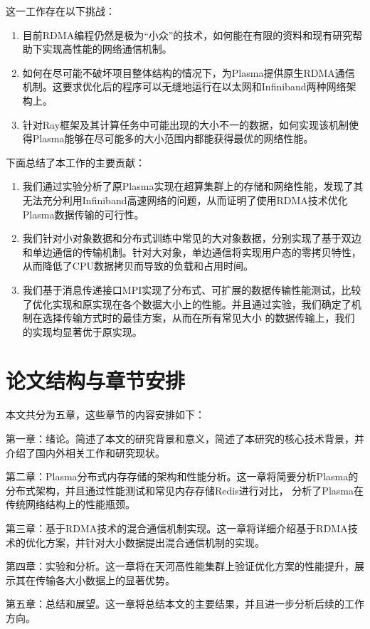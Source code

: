 这一工作存在以下挑战：

\begin{enumerate}
	\item 目前RDMA编程仍然是极为“小众”的技术，如何能在有限的资料和现有研究帮助下实现高性能的网络通信机制。
	\item 如何在尽可能不破坏项目整体结构的情况下，为Plasma提供原生RDMA通信机制。这要求优化后的程序可以无缝地运行在以太网和Infiniband两种网络架构上。
	\item 针对Ray框架及其计算任务中可能出现的大小不一的数据，如何实现该机制使得Plasma能够在尽可能多的大小范围内都能获得最优的网络性能。
\end{enumerate}

下面总结了本工作的主要贡献：

\begin{enumerate}
	\item 我们通过实验分析了原Plasma实现在超算集群上的存储和网络性能，发现了其无法充分利用Infiniband高速网络的问题，从而证明了使用RDMA技术优化Plasma数据传输的可行性。
	\item 我们针对小对象数据和分布式训练中常见的大对象数据，分别实现了基于双边和单边通信的传输机制。针对大对象，单边通信将实现用户态的零拷贝特性，从而降低了CPU数据拷贝而导致的负载和占用时间。
	\item 我们基于消息传递接口MPI实现了分布式、可扩展的数据传输性能测试，比较了优化实现和原实现在各个数据大小上的性能。并且通过实验，我们确定了机制在选择传输方式时的最佳方案，从而在所有常见大小
	的数据传输上，我们的实现均显著优于原实现。
\end{enumerate}

\section{论文结构与章节安排}
\label{sec:arrangement}

本文共分为五章，这些章节的内容安排如下：

第一章：绪论。简述了本文的研究背景和意义，简述了本研究的核心技术背景，并介绍了国内外相关工作和研究现状。

第二章：Plasma分布式内存存储的架构和性能分析。这一章将简要分析Plasma的分布式架构，并且通过性能测试和常见内存存储Redis进行对比，
分析了Plasma在传统网络结构上的性能瓶颈。

第三章：基于RDMA技术的混合通信机制实现。这一章将详细介绍基于RDMA技术的优化方案，并针对大小数据提出混合通信机制的实现。

第四章：实验和分析。这一章将在天河高性能集群上验证优化方案的性能提升，展示其在传输各大小数据上的显著优势。

第五章：总结和展望。这一章将总结本文的主要结果，并且进一步分析后续的工作方向。
